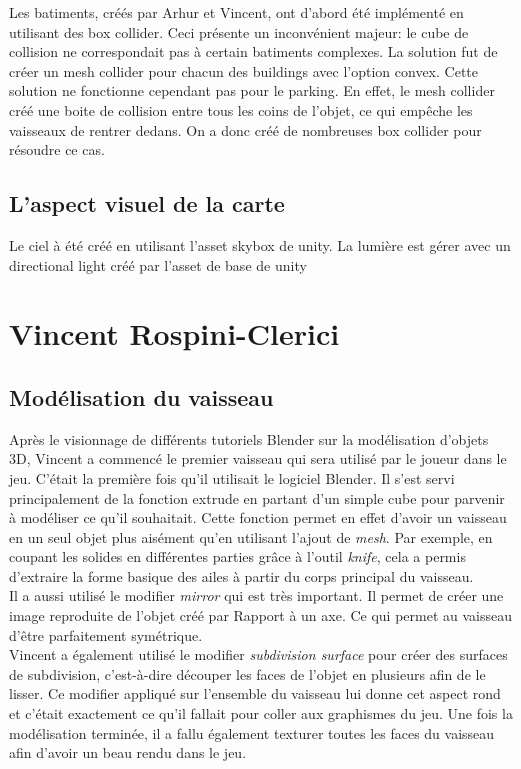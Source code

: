 \documentclass[10pt, titlepage]{report}
\begin{document}
Les batiments, créés par Arhur et Vincent, ont d'abord été implémenté en utilisant des box collider. Ceci présente un inconvénient majeur: le cube de collision ne correspondait pas à certain batiments complexes. La solution fut de créer un mesh collider pour chacun des buildings avec l'option convex. Cette solution ne fonctionne cependant pas pour le parking. En effet, le mesh collider créé une boite de collision entre tous les coins de l'objet, ce qui empêche les vaisseaux de rentrer dedans. On a donc créé de nombreuses box collider pour résoudre ce cas.

\subsection{L'aspect visuel de la carte}

Le ciel à été créé en utilisant l'asset skybox de unity. La lumière est gérer avec un directional light créé par l'asset de base de unity


\section{Vincent Rospini-Clerici}

\subsection{Modélisation du vaisseau}

Après le visionnage de différents tutoriels Blender sur la modélisation d'objets 3D, Vincent a commencé le premier vaisseau qui sera utilisé par le joueur dans le jeu. C'était la première fois qu'il utilisait le logiciel Blender. Il s'est servi principalement de la fonction extrude en partant d'un simple cube pour parvenir à modéliser ce qu'il souhaitait. Cette fonction permet en effet d'avoir un vaisseau en un seul objet plus aisément qu'en utilisant l'ajout de \textit{mesh}. Par exemple, en coupant les solides en différentes parties grâce à l'outil \textit{knife}, cela a permis d'extraire la forme basique des ailes à partir du corps principal du vaisseau.\\

Il a aussi utilisé le modifier \textit{mirror} qui est très important. Il permet de créer une image reproduite de l’objet créé par Rapport à un axe. Ce qui permet au vaisseau d'être parfaitement symétrique.\\

Vincent a également utilisé le modifier \textit{subdivision surface} pour créer des surfaces de subdivision, c’est-à-dire découper les faces de l’objet en plusieurs afin de le lisser. Ce modifier appliqué sur l’ensemble du vaisseau lui donne cet aspect rond et c’était exactement ce qu’il fallait pour coller aux graphismes du jeu.
Une fois la modélisation terminée, il a fallu également texturer toutes les faces du vaisseau afin d'avoir un beau rendu dans le jeu.\\
\end{document}
